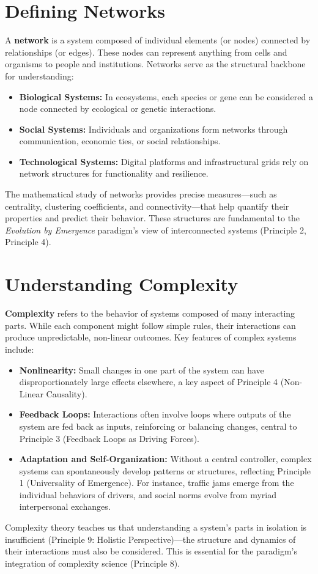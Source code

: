\documentclass[12pt,openany]{book}
\begin{document}
\section*{Defining Networks}
A \textbf{network} is a system composed of individual elements (or nodes) connected by relationships (or edges). These nodes can represent anything from cells and organisms to people and institutions. Networks serve as the structural backbone for understanding:
\begin{itemize}
    \item \textbf{Biological Systems:} In ecosystems, each species or gene can be considered a node connected by ecological or genetic interactions.
    \item \textbf{Social Systems:} Individuals and organizations form networks through communication, economic ties, or social relationships.
    \item \textbf{Technological Systems:} Digital platforms and infrastructural grids rely on network structures for functionality and resilience.
\end{itemize}
The mathematical study of networks provides precise measures---such as centrality, clustering coefficients, and connectivity---that help quantify their properties and predict their behavior. These structures are fundamental to the \emph{Evolution by Emergence} paradigm's view of interconnected systems (Principle 2, Principle 4). %

\section*{Understanding Complexity}
\textbf{Complexity} refers to the behavior of systems composed of many interacting parts. While each component might follow simple rules, their interactions can produce unpredictable, non-linear outcomes. Key features of complex systems include:
\begin{itemize}
    \item \textbf{Nonlinearity:} Small changes in one part of the system can have disproportionately large effects elsewhere, a key aspect of Principle 4 (Non-Linear Causality).
    \item \textbf{Feedback Loops:} Interactions often involve loops where outputs of the system are fed back as inputs, reinforcing or balancing changes, central to Principle 3 (Feedback Loops as Driving Forces).
    \item \textbf{Adaptation and Self-Organization:} Without a central controller, complex systems can spontaneously develop patterns or structures, reflecting Principle 1 (Universality of Emergence). For instance, traffic jams emerge from the individual behaviors of drivers, and social norms evolve from myriad interpersonal exchanges.
\end{itemize}
Complexity theory teaches us that understanding a system's parts in isolation is insufficient (Principle 9: Holistic Perspective)---the structure and dynamics of their interactions must also be considered. This is essential for the paradigm's integration of complexity science (Principle 8). %
\end{document}
